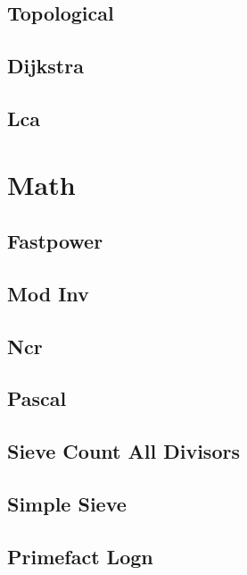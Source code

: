 \subsection{Topological}
\raggedbottom
\hrulefill
\subsection{Dijkstra}
\raggedbottom
\hrulefill
\subsection{Lca}
\raggedbottom
\hrulefill

\section{Math}
\subsection{Fastpower}
\raggedbottom
\hrulefill
\subsection{Mod Inv}
\raggedbottom
\hrulefill
\subsection{Ncr}
\raggedbottom
\hrulefill
\subsection{Pascal}
\raggedbottom
\hrulefill
\subsection{Sieve Count All Divisors}
\raggedbottom
\hrulefill
\subsection{Simple Sieve}
\raggedbottom
\hrulefill
\subsection{Primefact Logn}
\raggedbottom
\hrulefill
